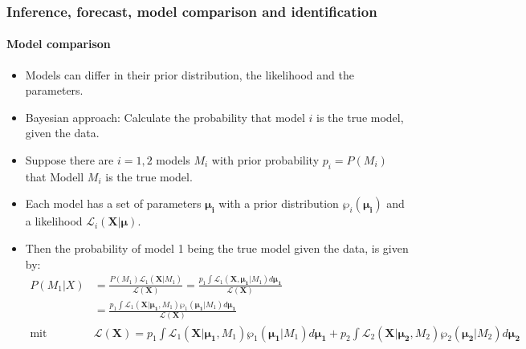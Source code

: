 \documentclass{beamer} %
\begin{document}
\begin{frame}\frametitle{Inference, forecast, model comparison and identification}\framesubtitle{Model comparison}
  \begin{itemize}
    \item Models can differ in their prior distribution, the likelihood and the parameters.
    \item Bayesian approach: Calculate the probability that model $i$ is the true model, given the data.
    \item Suppose there are $i=1,2$ models $M_i$ with prior probability $p_i=P(M_i)$ that Modell $M_i$ is the true model.
    \item Each model has a set of parameters $\boldsymbol{\mu_i}$ with a prior distribution $\wp_i(\boldsymbol{\mu_i})$ and a likelihood $\mathcal{L}_i(\mathbf{X}|\boldsymbol{\mu})$.
    \item Then the probability of model 1 being the true model given the data, is given by:
    \scriptsize\begin{align*}
      P(M_1|X) &= \frac{P(M_1)\mathcal{L}_1(\mathbf{X}|M_1)}{\mathcal{L}(\mathbf{X})} = \frac{p_1 \int \mathcal{L}_1(\mathbf{X},\mathbf{\boldsymbol{\mu_1}}|M_1)d \boldsymbol{\mu_1}}{\mathcal{L}(\mathbf{X})}\\
      &= \frac{p_1 \int \mathcal{L}_1(\mathbf{X}|\boldsymbol{\mu_1},M_1) \wp_1(\boldsymbol{\mu_1}|M_1) d \boldsymbol{\mu_1}}{\mathcal{L}(\mathbf{X})}\\
      \text{mit }& \mathcal{L}(\mathbf{X}) = p_1 \int \mathcal{L}_1(\mathbf{X}|\boldsymbol{\mu_1},M_1)\wp_1(\boldsymbol{\mu_1}|M_1)d\boldsymbol{\mu_1} + p_2 \int \mathcal{L}_2(\mathbf{X}|\boldsymbol{\mu_2},M_2)\wp_2(\boldsymbol{\mu_2}|M_2)d\boldsymbol{\mu_2}
    \end{align*}
  \end{itemize}
\end{frame}
\end{document}
